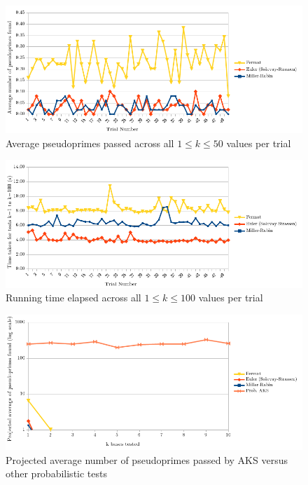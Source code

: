 \documentclass{article}
\begin{document}
\FloatBarrier
\begin{figure}[h!]
\caption{Average pseudoprimes passed across all $1 \leq k \leq 50$ values per trial}
\label{fig:pprimes_v_trial}
\centering
\includegraphics[width=\textwidth]{pprimes_v_trial}
\end{figure}
\FloatBarrier

\FloatBarrier
\begin{figure}[h!]
\caption{Running time elapsed across all $1 \leq k \leq 100$ values per trial}
\label{fig:time_v_trial}
\centering
\includegraphics[width=\textwidth]{time_v_trial}
\end{figure}
\FloatBarrier

\FloatBarrier
\begin{figure}[h!]
\caption{Projected average number of pseudoprimes passed by AKS versus other probabilistic tests}
\label{fig:paks_proj_pprimes_v_bases}
\centering
\includegraphics[width=\textwidth]{paks_proj_pprimes_v_bases}
\end{figure}
\FloatBarrier
\end{document}
